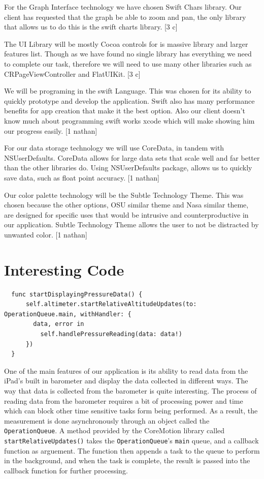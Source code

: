 \documentclass[onecolumn, draftclsnofoot,10pt, compsoc]{IEEEtran}
\begin{document}
For the Graph Interface technology we have chosen Swift Chars library.
Our client has requested that the graph be able to zoom and pan, the only library that allows us to do this is the swift charts library.  [3 c]

The UI Library will be mostly Cocoa controls for is massive library and larger features list. 
Though as we have found no single library has everything we need to complete our task, therefore we will need to use many other libraries such as CRPageViewController and FlatUIKit. [3 c]
    

We will be programing in the swift Language. 
This was chosen for its ability to quickly prototype and develop the application. 
Swift also has many performance benefits for app creation that make it the best option. 
Also our client doesn't know much about programming swift works xcode which will make showing him our progress easily. [1 nathan]

For our data storage technology we will use CoreData, in tandem with NSUserDefaults.
CoreData allows for large data sets that scale well and far better than the other libraries do.  
Using NSUserDefaults package, allows us to quickly save data, such as float point accuracy. [1 nathan]

Our color palette technology will be the Subtle Technology Theme.
This was chosen because the other options, OSU similar theme and Nasa similar theme, are designed for specific uses that would be intrusive and counterproductive in our application.
Subtle Technology Theme allows the user to not be distracted by unwanted color.  [1 nathan]

\section{Interesting Code}
\begin{lstlisting}
  func startDisplayingPressureData() {
      self.altimeter.startRelativeAltitudeUpdates(to: OperationQueue.main, withHandler: {
        data, error in
          self.handlePressureReading(data: data!)
      })
  }

\end{lstlisting}

One of the main features of our application is its ability to read data from the iPad's built in barometer and display the data collected in different ways.
The way that data is collected from the barometer is quite interesting.
The process of reading data from the barometer requires a bit of processing power and time which can block other time sensitive tasks form being performed.
As a result, the measurement is done asynchronously through an object called the \texttt{OperationQueue}.
A method provided by the CoreMotion library called \texttt{startRelativeUpdates()} takes the \texttt{OperationQueue}'s \texttt{main} queue, and a callback function as arguement.
The function then appends a task to the queue to perform in the background, and when the task is complete, the result is passed into the callback function for further processing.\\
\end{document}
